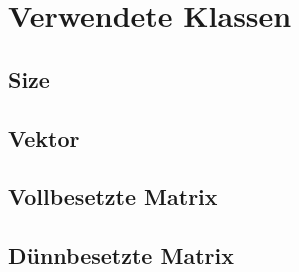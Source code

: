 \documentclass[12pt,a4paper]{scrartcl}
\numberwithin{equation}{section}
\numberwithin{myalgctr}{section}
\numberwithin{mytheoremctr}{subsection}
\numberwithin{mykorollarctr}{subsection}
\numberwithin{mylemmactr}{subsection}
\numberwithin{mybeispielctr}{subsection}
\begin{document}
	
	
	\newpage
	\appendix
	\section{Verwendete Klassen}
	\subsection{Size}
	
	\subsection{Vektor}
	
	\subsection{Vollbesetzte Matrix}
	
	\subsection{D\"unnbesetzte Matrix}
	
	
	\newpage
	\printbibliography
	\lstlistoflistings
	\listoffigures
	\thispagestyle{firststyle}
	
\end{document}
